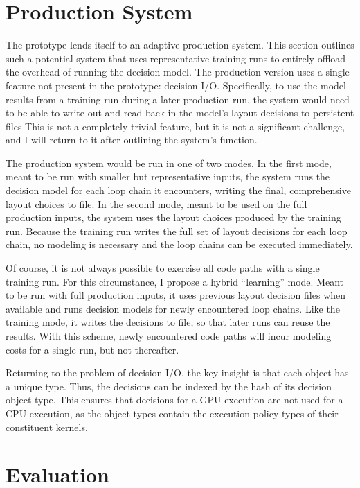 \section{Production System}

The \FormatDecisions{} prototype lends itself to an adaptive production system.
This section outlines such a potential system that uses representative training runs to entirely offload the overhead of running the decision model.
The production version uses a single feature not present in the prototype: decision I/O.
Specifically, to use the model results from a training run during a later production run, the system would need to be able to write out and read back in the model's layout decisions to persistent files 
This is not a completely trivial feature, but it is not a significant challenge, and I will return to it after outlining the system's function.

The production system would be run in one of two modes.
In the first mode, meant to be run with smaller but representative inputs, the system runs the decision model for each loop chain it encounters, writing the final, comprehensive layout choices to file.
In the second mode, meant to be used on the full production inputs, the system uses the layout choices produced by the training run.
Because the training run writes the full set of layout decisions for each loop chain, no modeling is necessary and the loop chains can be executed immediately.

Of course, it is not always possible to exercise all code paths with a single training run. 
For this circumstance, I propose a hybrid ``learning'' mode.
Meant to be run with full production inputs, it uses previous layout decision files when available and runs decision models for newly encountered loop chains.
Like the training mode, it writes the decisions to file, so that later runs can reuse the results.
With this scheme, newly encountered code paths will incur modeling costs for a single run, but not thereafter.

Returning to the problem of decision I/O, the key insight is that each \FormatDecisions{} object has a unique type.
Thus, the decisions can be indexed by the hash of its decision object type.
This ensures that decisions for a GPU execution are not used for a CPU execution, as the \FormatDecisions{} object types contain the execution policy types of their constituent kernels.


\section{Evaluation}

